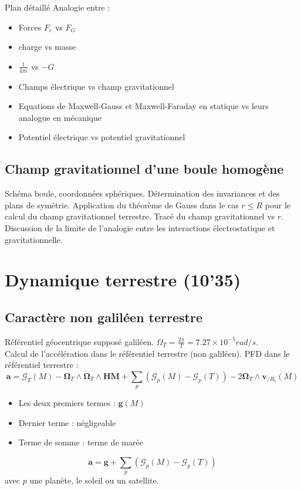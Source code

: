 \begin{reportBlock}{Plan détaillé}
Analogie entre :

\begin{itemize}
\item Forces $F_e$ vs $F_G$
\item charge vs masse
\item $\frac{1}{4 \pi \epsilon}$ vs $-G$
\item Champs électrique vs champ gravitationnel
\item Equations de Maxwell-Gauss et Maxwell-Faraday en statique vs leurs analogue en mécanique
\item Potentiel électrique vs potentiel gravitationnel
\end{itemize}

\subsection{Champ gravitationnel d'une boule homogène}

Schéma boule, coordonnées sphériques. Détermination des invariances et des plans de symétrie. Application du théorème de Gauss dans le cas $r\leq R$ pour le calcul du champ gravitationnel terrestre. Tracé du champ gravitationnel vs $r$. Discussion de la limite de l'analogie entre les interactions électrostatique et gravitationnelle.

\section{Dynamique terrestre (10'35)}

\subsection{Caractère non galiléen terrestre}

Référentiel géocentrique supposé galiléen.
$\Omega_T = \frac{2 \pi}{T}=7.27\times10^{-5} rad/s$.  \\

Calcul de l'accélération dans le référentiel terrestre (non galiléen). PFD dans le référentiel terrestre :
\begin{equation}
    \mathbf a = \mathbf{\mathcal{G}}_T(M) - \mathbf \Omega_T \land \mathbf \Omega_T \land \mathbf{HM} + \sum_p \left(\mathbf{\mathcal{G}}_p(M) - \mathbf{\mathcal{G}}_p(T) \right) - 2  \mathbf \Omega_T \land \mathbf v_{/R_t}(M)
\end{equation}
\begin{itemize}
    \item Les deux premiers termes : $\mathbf g(M)$ 
    \item Dernier terme : négligeable
    \item Terme de somme : terme de marée
\end{itemize}
\begin{equation}
    \mathbf{a} = \mathbf{g} + \sum_{p} \left( \mathbf{\mathcal{G}}_p(M) - \mathbf{\mathcal{G}}_p(T) \right)
\end{equation}
avec $p$ une planète, le soleil ou un satellite.\\


\end{reportBlock}
